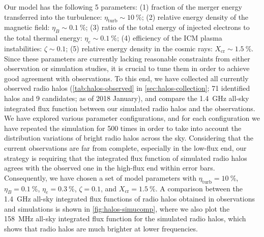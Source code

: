 \documentclass[twocolumn]{aastex62}
\newcommand{\R}[1]{\mathrm{#1}}
\newcommand{\editone}[1]{{\leavevmode\color{cyan}#1}}
\begin{document}
Our model has the following 5 parameters:
(1) fraction of the merger energy transferred into the turbulence:
$\eta_{\R{turb}} \sim \SI{10}{\percent}$;
(2) relative energy density of the magnetic field:
$\eta_B \sim \SI{0.1}{\percent}$;
(3) ratio of the total energy of injected electrons to the total thermal
energy: $\eta_e \sim \SI{0.1}{\percent}$;
(4) efficiency of the ICM plasma instabilities:
$\zeta \sim 0.1$;
(5) relative energy density in the cosmic rays:
$X_{\R{cr}} \sim \SI{1.5}{\percent}$.
\editone{Since these parameters are currently lacking reasonable
constraints from either observation or simulation studies, it is crucial to
tune them in order to achieve good agreement with observations.} %
To this end, we have collected all currently observed radio halos
(\autoref{tab:halos-observed} in \autoref{sec:halos-collection};
71 identified halos and 9 candidates; as of 2018 January),
and compare the \SI{1.4}{\GHz} all-sky integrated flux function between
our simulated radio halos and the observations.
We have explored various parameter configurations,
and for each configuration we have repeated the simulation for 500 times
in order to take into account the distribution variations of bright
radio halos across the sky.
Considering that the current observations are far from complete,
especially in the low-flux end, our strategy is requiring that the
integrated flux function of simulated radio halos agrees with the
observed one in the high-flux end within error bars.
Consequently, we have chosen a set of model parameters with
$\eta_{\R{turb}} = \SI{10}{\percent}$, $\eta_B = \SI{0.1}{\percent}$,
$\eta_e = \SI{0.3}{\percent}$, $\zeta = 0.1$,
and $X_{\R{cr}} = \SI{1.5}{\percent}$.
A comparison between the \SI{1.4}{\GHz} all-sky integrated flux
functions of radio halos obtained in observations and simulations is
shown in \autoref{fig:halos-simucomp},
where we also plot the \SI{158}{\MHz} all-sky integrated flux function
for the simulated radio halos, which shows that radio halos are much
brighter at lower frequencies.
\end{document}
